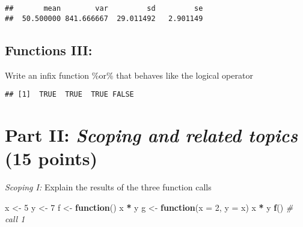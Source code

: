 \documentclass[12,]{article}
\newenvironment{Shaded}{\begin{snugshade}}{\end{snugshade}}
\newcommand{\KeywordTok}[1]{\textcolor[rgb]{0.13,0.29,0.53}{\textbf{#1}}}
\newcommand{\DataTypeTok}[1]{\textcolor[rgb]{0.13,0.29,0.53}{#1}}
\newcommand{\DecValTok}[1]{\textcolor[rgb]{0.00,0.00,0.81}{#1}}
\newcommand{\StringTok}[1]{\textcolor[rgb]{0.31,0.60,0.02}{#1}}
\newcommand{\CommentTok}[1]{\textcolor[rgb]{0.56,0.35,0.01}{\textit{#1}}}
\newcommand{\OtherTok}[1]{\textcolor[rgb]{0.56,0.35,0.01}{#1}}
\newcommand{\ControlFlowTok}[1]{\textcolor[rgb]{0.13,0.29,0.53}{\textbf{#1}}}
\newcommand{\OperatorTok}[1]{\textcolor[rgb]{0.81,0.36,0.00}{\textbf{#1}}}
\newcommand{\NormalTok}[1]{#1}
\begin{document}
\begin{verbatim}
##       mean        var         sd         se 
##  50.500000 841.666667  29.011492   2.901149
\end{verbatim}

\subsection{Functions III:}\label{functions-iii}

Write an infix function \%or\% that behaves like the logical operator
\textbar{}

\begin{Shaded}
\end{Shaded}

\begin{verbatim}
## [1]  TRUE  TRUE  TRUE FALSE
\end{verbatim}

\section{\texorpdfstring{Part II: \emph{Scoping and related topics } (15
points)}{Part II: Scoping and related topics  (15 points)}}\label{part-ii-scoping-and-related-topics-15-points}

\emph{Scoping I:} Explain the results of the three function calls

\begin{Shaded}
\begin{Highlighting}[]
\NormalTok{x <-}\StringTok{ }\DecValTok{5}
\NormalTok{y <-}\StringTok{ }\DecValTok{7}
\NormalTok{f <-}\StringTok{ }\ControlFlowTok{function}\NormalTok{() x }\OperatorTok{*}\StringTok{ }\NormalTok{y}
\NormalTok{g <-}\StringTok{ }\ControlFlowTok{function}\NormalTok{(}\DataTypeTok{x =} \DecValTok{2}\NormalTok{, }\DataTypeTok{y =}\NormalTok{ x) x }\OperatorTok{*}\StringTok{ }\NormalTok{y}
\KeywordTok{f}\NormalTok{() }\CommentTok{# call 1}
\end{Highlighting}
\end{Shaded}
\end{document}
